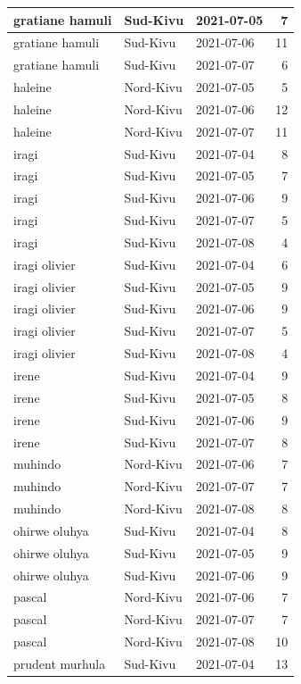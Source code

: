 \documentclass[
]{book}
\begin{document}
\begin{table}
\begin{tabular}[t]{l|l|l|r}
\hline
gratiane hamuli & Sud-Kivu & 2021-07-05 & 7\\
\hline
gratiane hamuli & Sud-Kivu & 2021-07-06 & 11\\
\hline
gratiane hamuli & Sud-Kivu & 2021-07-07 & 6\\
\hline
haleine & Nord-Kivu & 2021-07-05 & 5\\
\hline
haleine & Nord-Kivu & 2021-07-06 & 12\\
\hline
haleine & Nord-Kivu & 2021-07-07 & 11\\
\hline
iragi & Sud-Kivu & 2021-07-04 & 8\\
\hline
iragi & Sud-Kivu & 2021-07-05 & 7\\
\hline
iragi & Sud-Kivu & 2021-07-06 & 9\\
\hline
iragi & Sud-Kivu & 2021-07-07 & 5\\
\hline
iragi & Sud-Kivu & 2021-07-08 & 4\\
\hline
iragi olivier & Sud-Kivu & 2021-07-04 & 6\\
\hline
iragi olivier & Sud-Kivu & 2021-07-05 & 9\\
\hline
iragi olivier & Sud-Kivu & 2021-07-06 & 9\\
\hline
iragi olivier & Sud-Kivu & 2021-07-07 & 5\\
\hline
iragi olivier & Sud-Kivu & 2021-07-08 & 4\\
\hline
irene & Sud-Kivu & 2021-07-04 & 9\\
\hline
irene & Sud-Kivu & 2021-07-05 & 8\\
\hline
irene & Sud-Kivu & 2021-07-06 & 9\\
\hline
irene & Sud-Kivu & 2021-07-07 & 8\\
\hline
muhindo & Nord-Kivu & 2021-07-06 & 7\\
\hline
muhindo & Nord-Kivu & 2021-07-07 & 7\\
\hline
muhindo & Nord-Kivu & 2021-07-08 & 8\\
\hline
ohirwe oluhya & Sud-Kivu & 2021-07-04 & 8\\
\hline
ohirwe oluhya & Sud-Kivu & 2021-07-05 & 9\\
\hline
ohirwe oluhya & Sud-Kivu & 2021-07-06 & 9\\
\hline
pascal & Nord-Kivu & 2021-07-06 & 7\\
\hline
pascal & Nord-Kivu & 2021-07-07 & 7\\
\hline
pascal & Nord-Kivu & 2021-07-08 & 10\\
\hline
prudent murhula & Sud-Kivu & 2021-07-04 & 13\\

\end{tabular}
\end{table}
\end{document}
